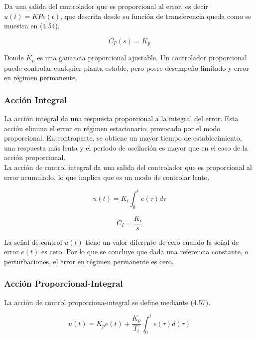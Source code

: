 \documentclass[a4paper,12pt,twoside]{proyectotanquesecci}
\begin{document}
Da una salida del controlador que es proporcional al error, es decir $u(t)=KPe(t)$, que descrita desde su función de transferencia queda como se muestra en (4.54).

\begin{equation}
C_{P}(s)=K_{p}
\label{Ecu 3}
\end{equation}

Donde $K_{p}$ es una ganancia proporcional ajustable. Un controlador proporcional puede controlar cualquier planta estable, pero posee desempeño limitado y error
en régimen permanente. 

\subsubsection*{Acción Integral}

La acción integral da una respuesta proporcional a la integral del error. Esta acción elimina el error en régimen estacionario, provocado por el modo proporcional. En contraparte, se obtiene un mayor tiempo de establecimiento, una respuesta más lenta y el periodo de oscilación es mayor que en el caso de la acción proporcional. \\

La acción de control integral da una salida del controlador que es proporcional al error acumulado, lo que implica que es un modo de controlar lento.

\begin{equation}
u(t)=K_{i}\int ^{t}_{0}e\left( \tau \right) d\tau
\label{Ecu 3}
\end{equation}

\begin{equation}
C_{I}=\frac{K_{i}}{s}
\end{equation}

La señal de control $u(t)$ tiene un valor diferente de cero cuando la señal de error $e(t)$ es cero. Por lo que se concluye que dada una referencia constante, o perturbaciones, el error en régimen permanente es cero.

\subsubsection*{Acción Proporcional-Integral}

La acción de control proporciona-integral se define mediante (4.57).

\begin{equation}
u(t)=K_{p}e(t)+ \frac{K_{p}}{T_{i}} \int ^{t}_{0}e\left( \tau \right) d\left( \tau \right)
\end{equation}
\end{document}
